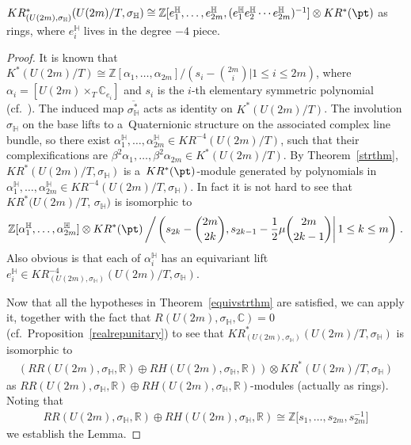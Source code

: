 \begin{Lemma}
\label{quatring}
$KR^*_{(U(2m),
\sigma_\mathbb{H})}(U(2m)/T,
\sigma_\mathbb{H})\cong \mathbb{Z}[e_1^\mathbb{H}, \dots, e_{2m}^\mathbb{H}, (e_1^\mathbb{H}e_2^\mathbb{H}\cdots
e_{2m}^\mathbb{H})^{-1}]\otimes KR^*(\pt)$ as rings, where $e_i^\mathbb{H}$ lives in the degree $-4$ piece.
\end{Lemma}
\begin{proof}
It is known that $K^*(U(2m)/T)\cong\mathbb{Z}[\alpha_1, \dots, \alpha_{2m}]/(s_i-\binom{2m}{i}|1\leq i\leq 2m)$, where
$\alpha_i=[U(2m)\times_T\mathbb{C}_{e_i}]$ and $s_i$ is the $i$-th elementary symmetric polynomial (cf.~\cite[Proposition 2.7.13]{At}).
The induced map $\overline{\sigma_\mathbb{H}^*}$ acts as identity on $K^*(U(2m)/T)$.
The involution $\sigma_\mathbb{H}$ on the base lifts to a~Quaternionic structure
on the associated complex line bundle, so there \mbox{exist}
$\alpha_1^\mathbb{H}, \dots, \alpha_{2m}^\mathbb{H}\in KR^{-4}(U(2m)/T)$, such that their complexif\/ications are
$\beta^2\alpha_1, \dots, \beta^2\alpha_{2m}\in K^*(U(2m)/T)$.
By Theorem~\ref{strthm}, $KR^*(U(2m)/T,
\sigma_\mathbb{H})$ is a~$KR^*(\pt)$-module generated by polynomials in $\alpha_1^\mathbb{H}, \dots, \alpha_{2m}^\mathbb{H}\in
KR^{-4}(U(2m)/T,
\sigma_\mathbb{H})$.
In fact it is not hard to see that $KR^*(U(2m)/T$,
$\sigma_\mathbb{H})$ is isomorphic to
\begin{gather*}
\mathbb{Z}[\alpha_1^\mathbb{H}, \dots, \alpha_{2m}^\mathbb{H}]\otimes
KR^*(\pt)\left/\left.\left(s_{2k}-\binom{2m}{2k}, s_{2k-1}-\frac{1}{2}\mu\binom{2m}{2k-1}\right|1\leq k\leq
m\right)\right..
\end{gather*}
Also obvious is that each of $\alpha_i^\mathbb{H}$ has an equivariant lift $e_i^\mathbb{H}\in KR^{-4}_{(U(2m),
\sigma_\mathbb{H})}(U(2m)/T,\sigma_\mathbb{H})$.

Now that all the hypotheses in Theorem~\ref{equivstrthm} are satisf\/ied, we can apply it, together with the fact that
$R(U(2m),
\sigma_\mathbb{H}, \mathbb{C})=0$ (cf.\ Proposition~\ref{realrepunitary}) to see that $KR^*_{(U(2m),
\sigma_\mathbb{H})}(U(2m)/T,
\sigma_\mathbb{H})$ is isomorphic to
\begin{gather*}
(RR(U(2m),
\sigma_\mathbb{H}, \mathbb{R})\oplus RH(U(2m),
\sigma_\mathbb{H}, \mathbb{R}))\otimes KR^*(U(2m)/T,
\sigma_\mathbb{H})
\end{gather*}
as $RR(U(2m),
\sigma_\mathbb{H}, \mathbb{R})\oplus RH(U(2m),
\sigma_\mathbb{H}, \mathbb{R})$-modules (actually as rings).
Noting that
\begin{gather*}
RR(U(2m),\sigma_\mathbb{H}, \mathbb{R})\oplus RH(U(2m),
\sigma_\mathbb{H}, \mathbb{R})\cong\mathbb{Z}\big[s_1, \dots, s_{2m}, s_{2m}^{-1}\big]
\end{gather*}
we establish the Lemma.
\end{proof}

